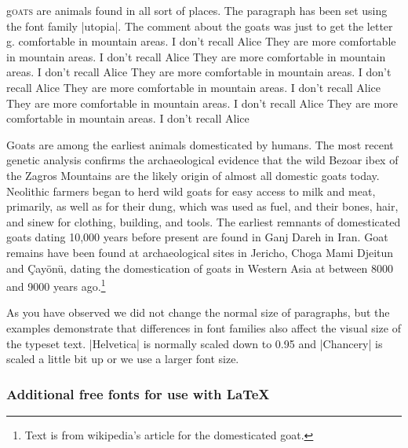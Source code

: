 \renewcommand{\LettrineFontHook}{\fontfamily{phv}\fontseries{bx}}%



\par\leavevmode

\lettrine[lines=5, lhang=0.1,lraise=0.28,findent=1pt]{g}{oats} are animals found in all sort of places. The paragraph has been set using the font family |utopia|. The comment about the goats was just to get the letter g.
comfortable in mountain areas. I don't recall Alice  They are more
comfortable in mountain areas. I don't recall Alice   They are more
comfortable in mountain areas. I don't recall Alice   They are more
comfortable in mountain areas. I don't recall Alice  They are more
comfortable in mountain areas. I don't recall Alice  They are more
comfortable in mountain areas. I don't recall Alice  They are more
comfortable in mountain areas. I don't recall Alice 

\medskip



\lettrine{G}{o}ats are among the earliest animals domesticated by humans. The most recent genetic analysis confirms the archaeological evidence that the wild Bezoar ibex of the Zagros Mountains are the likely origin of almost all domestic goats today. Neolithic farmers began to herd wild goats for easy access to milk and meat, primarily, as well as for their dung, which was used as fuel, and their bones, hair, and sinew for clothing, building, and tools. The earliest remnants of domesticated goats dating 10,000 years before present are found in Ganj Dareh in Iran. Goat remains have been found at archaeological sites in Jericho, Choga Mami Djeitun and Çay\"on\"u, dating the domestication of goats in Western Asia at between 8000 and 9000 years ago.\footnote{Text is from wikipedia's article for the domesticated goat.}

\bgroup


As you have observed we did not change the normal size of paragraphs, but the examples demonstrate that differences in font families also affect the visual size of the typeset text. |Helvetica| is normally scaled down to 0.95 and |Chancery| is scaled a little bit up or we use a larger font size.
\egroup

\everypar{}%

\subsubsection{\textsf{Additional free fonts for use with \LaTeX}}

